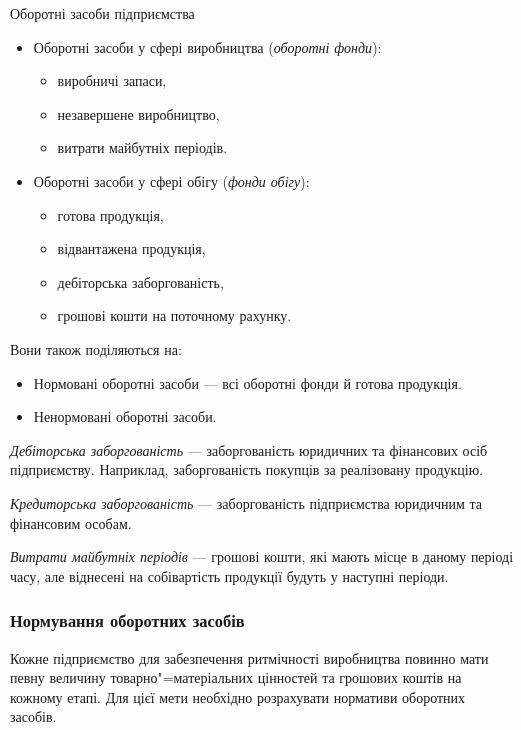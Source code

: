 \documentclass[a5paper,10pt,notitlepage,pdftex,headsepline]{scrartcl}
\begin{document}
      Оборотні засоби підприємства
      \begin{itemize}
        \item Оборотні засоби у сфері виробництва (\emph{оборотні фонди}):
          \begin{itemize}
            \item виробничі запаси,
            \item незавершене виробництво,
            \item витрати майбутніх періодів.
          \end{itemize}
        \item Оборотні засоби у сфері обігу (\emph{фонди обігу}):
          \begin{itemize}
            \item готова продукція,
            \item відвантажена продукція,
            \item дебіторська заборгованість,
            \item грошові кошти на поточному рахунку.
          \end{itemize}
      \end{itemize}

      Вони також поділяються на:
      \begin{itemize}
        \item Нормовані оборотні засоби --- всі оборотні фонди й готова
          продукція.
        \item Ненормовані оборотні засоби.
      \end{itemize}

      \emph{Дебіторська заборгованість} --- заборгованість юридичних та
      фінансових осіб підприємству.
      Наприклад, заборгованість покупців за реалізовану продукцію.

      \emph{Кредиторська заборгованість} --- заборгованість підприємства
      юридичним та фінансовим особам.

      \emph{Витрати майбутніх періодів} --- грошові кошти, які мають місце в
      даному періоді часу, але віднесені на собівартість продукції будуть у
      наступні періоди.

    \subsubsection{Нормування оборотних засобів}
      Кожне підприємство для забезпечення ритмічності виробництва повинно мати
      певну величину товарно"=матеріальних цінностей та грошових коштів на
      кожному етапі.
      Для цієї мети необхідно розрахувати нормативи оборотних засобів.
\end{document}
